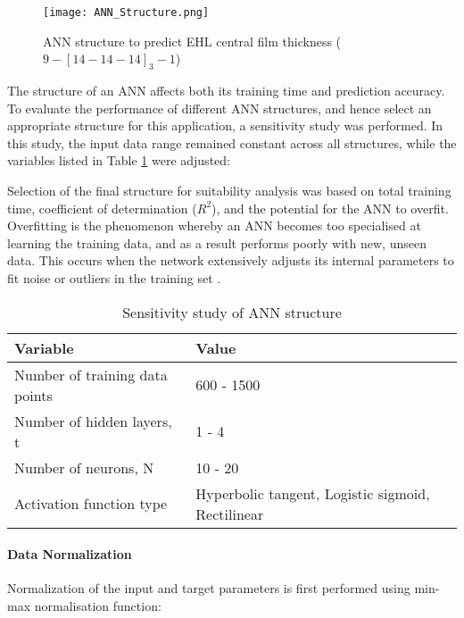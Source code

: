 \begin{figure}  
	\texttt{[image: ANN\_Structure.png]}
	\caption{ANN structure to predict EHL central film thickness ($9-[14-14-14]_3-1$)}
	\label{ANN structure}
\end{figure} 

The structure of an ANN affects both its training time and prediction accuracy. To evaluate the performance of different ANN structures, and hence select an appropriate structure for this application, a sensitivity study was performed. In this study, the input data range remained constant across all structures, while the variables listed in Table \ref{Sensitivity study of ANN structure} were adjusted:

Selection of the final structure for suitability analysis was based on total training time, coefficient of determination ($R^2$), and the potential for the ANN to overfit. Overfitting is the phenomenon whereby an ANN becomes too specialised at learning the training data, and as a result performs poorly with new, unseen data. This occurs when the network extensively adjusts its internal parameters to fit noise or outliers in the training set \cite{Ying2019}.

\begin{table*}
	\caption{Sensitivity study of ANN structure}
	\label{Sensitivity study of ANN structure}
	\centering
	\renewcommand{\arraystretch}{1.5}%
	\begin{tabular}{|P{0.4\textwidth}|P{0.4\textwidth}|}
		\hline
		\textbf{Variable} & \textbf{Value} \\ [0.5ex]
		\hline
		Number of training data points & 600 - 1500 \\ [0.5ex]
		\hline
		Number of hidden layers, t & 1 - 4 \\ [0.5ex]
		\hline
		Number of neurons, N & 10 - 20 \\ [0.5ex]
	    \hline
		Activation function type & Hyperbolic tangent, Logistic sigmoid, Rectilinear \\ [0.5ex]
		\hline
	\end{tabular}
\end{table*}

\paragraph{Data Normalization}

Normalization of the input and target parameters is first performed using min-max normalisation function:

